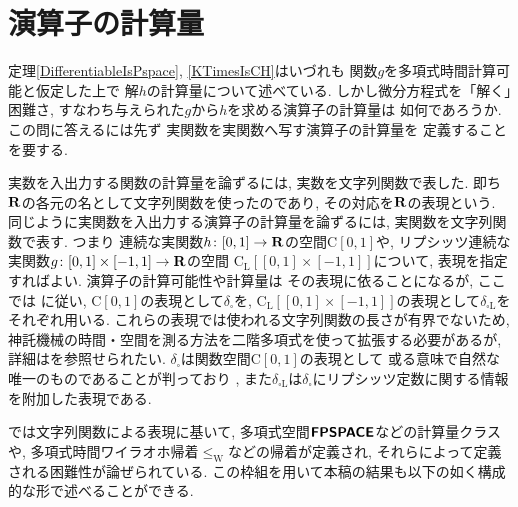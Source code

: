 \section{演算子の計算量}

定理\ref{DifferentiableIsPspace}, 
\ref{KTimesIsCH}はいづれも
関数$g$を多項式時間計算可能と仮定した上で
解$h$の計算量について述べている. 
しかし微分方程式を「解く」困難さ, 
すなわち与えられた$g$から$h$を求める演算子の計算量は
如何であろうか. 
この問に答えるには先ず
実関数を実関数へ写す演算子の計算量を
定義することを要する. 

\newcommand{\OpIVP}{\mathit{ODE}}
\newcommand{\deltabox}{\delta _\square}
\newcommand{\deltaboxLip}{\delta _{\square \mathrm L}}
\newcommand{\classtwofont}[1]{\text{\bfseries \sffamily \upshape #1}}
\newcommand{\classFPSPACEtwo}{\classtwofont{FPSPACE}}
\newcommand{\classCHtwo}{\classtwofont{CH}}
\newcommand{\redMF}{\leq _{\mathrm{mf}}}
\newcommand{\redW}{\leq _{\mathrm W}}
\newcommand{\redSW}{\leq _{\mathrm{sW}}}
\newcommand{\classLip}{\mathrm C _{\mathrm L}}
\newcommand{\classC}{\mathrm C}

実数を入出力する関数の計算量を論ずるには, 
実数を文字列関数で表した. 
即ち$\mathbf R$の各元の名として文字列関数を使ったのであり, 
その対応を$\mathbf R$の表現という. 
同じように実関数を入出力する演算子の計算量を論ずるには, 
実関数を文字列関数で表す. 
つまり
連続な実関数$h \colon [0,1] \to \mathbf R$の空間$\classC [0, 1]$や, 
リプシッツ連続な実関数$g \colon [0, 1] \times [-1, 1] \to \mathbf R$の空間
$\classLip [[0, 1] \times [-1, 1]]$について, 
表現を指定すればよい. 
演算子の計算可能性や計算量は
その表現に依ることになるが, 
ここでは
\cite{kawamura2010operators}に従い, 
$\classC [0, 1]$の表現として$\deltabox$を, 
$\classLip [[0, 1] \times [-1, 1]]$の表現として$\deltaboxLip$を
それぞれ用いる. 
これらの表現では使われる文字列関数の長さが有界でないため, 
神託機械の時間・空間を測る方法を二階多項式を使って拡張する必要があるが, 
詳細は\cite{kawamura2010operators}を参照せられたい. 
$\deltabox$は関数空間$\classC [0, 1]$の表現として
或る意味で自然な唯一のものであることが判っており
\cite{}, 
また$\deltaboxLip$は$\deltabox$にリプシッツ定数に関する情報を附加した表現である. 

\cite{kawamura2010operators}では文字列関数による表現に基いて, 
多項式空間$\classFPSPACEtwo$などの計算量クラスや, 
多項式時間ワイラオホ帰着$\redW$などの帰着が定義され, 
それらによって定義される困難性が論ぜられている. 
この枠組を用いて本稿の結果も以下の如く構成的な形で述べることができる. 


